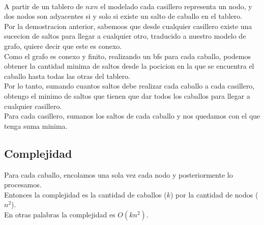 \\
A partir de un tablero de $nxn$ el modelado cada casillero representa un nodo, y dos nodos son adyacentes si y solo si existe un salto de caballo en el tablero.
\\
Por la demostracion anterior, sabemoos que desde cualquier casillero existe una sucecion de saltos para llegar a cualquier otro, traducido a nuestro modelo de grafo, quiere decir que este es conexo.
\\
Como el grafo es conexo y finito, realizando un bfs para cada caballo, podemos obtener la cantidad minima de saltos desde la pocicion en la que se encuentra el caballo hasta todas las otras del tablero.
\\
Por lo tanto, sumando cuantos saltos debe realizar cada caballo a cada casillero, obtengo el minimo de saltos que tienen que dar todos los caballos para llegar a cualquier casillero.
\\
Para cada casillero, sumanos los saltos de cada caballo y nos quedamos con el que tenga suma minima.

\subsection{Complejidad}
Para cada caballo, encolamos una sola vez cada nodo y posteriormente lo procesamos.
\\
Entonces la complejidad es la cantidad de caballos ($k$) por la cantidad de nodos ($n^2$).
\\
En otras palabras la complejidad es $O(kn^2)$.

